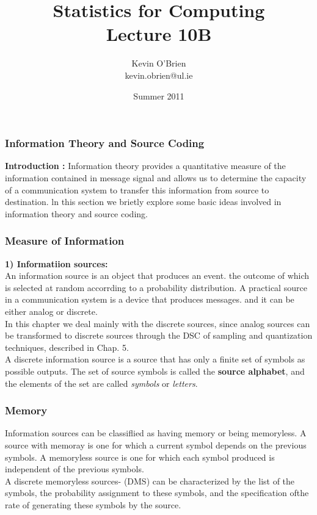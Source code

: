 \documentclass[a4]{beamer}
\title[MA4413t]{Statistics for Computing \\ {\normalsize Lecture 10B}}
\author[Kevin O'Brien]{Kevin O'Brien \\ {\scriptsize kevin.obrien@ul.ie}}
\date{Summer 2011}
\institute[Maths \& Stats]{Dept. of Mathematics \& Statistics, \\ University \textit{of} Limerick}
\begin{document}
\begin{frame}
\frametitle{Information Theory and Source Coding}

\textbf{ Introduction : } Information theory provides a quantitative measure of the information contained in message signal and allows us to determine the capacity of a communication system to transfer this information from source to destination.
 ln this section we brietly explore some basic ideas involved in information theory and source coding.
\end{frame}


\begin{frame}
\frametitle{Measure of Information}

\textbf{1) Informatiion sources:}\\

An information source is an object that produces an event. the outcome of which is selected at
 random accorrding to a probability distribution. A practical source in a communication system is a
device that produces messages. and it can be either analog or discrete.\\ In this chapter we deal mainly
with the discrete sources, since analog sources can be transformed to discrete sources through the DSC
of sampling and quantization techniques, described in Chap. 5. \\ \bigskip A discrete information source is a
source that has only a finite set of symbols as possible outputs. The set of source symbols is called the
\textbf{source alphabet}, and the elements of the set are called \emph{ symbols} or \emph{letters}.
\end{frame}
\begin{frame}
\frametitle{Memory}
Information sources can be classiflied as having memory or being memoryless. A source with
memoray is one for which a current symbol depends on the previous symbols. A memoryless source is
one for which each symbol produced is independent of the previous symbols.
\\ \bigskip
A discrete memoryless sources- (DMS) can be characterized by the list of the symbols, the
probability assignment to these symbols, and the specification ofthe rate of generating these symbols by the source.
\end{frame}
\end{document}
